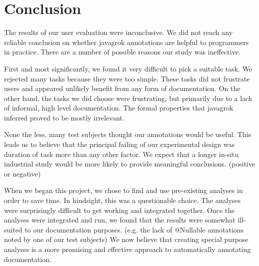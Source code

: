 \section{Conclusion}

The results of our user evaluation were inconclusive.  We did not reach any reliable conclusion on whether javagrok annotations are helpful to programmers in practice.  There are a number of possible reasons our study was ineffective.

First and most significantly, we found it very difficult to pick a suitable task.  We rejected many tasks because they were too simple.  These tasks did not frustrate users and appeared unlikely benefit from any form of documentation.  On the other hand, the tasks we did choose were frustrating, but primarily due to a lack of informal, high level documentation.  The formal properties that javagrok inferred proved to be mostly irrelevant.

None the less, many test subjects thought our annotations would be useful.  This leads us to believe that the principal failing of our experimental design was duration of task more than any other factor.  We expect that a longer in-situ industrial study would be more likely to provide meaningful conclusions. (positive or negative)

When we began this project, we chose to find and use pre-existing analyses in order to save time.  In hindsight, this was a questionable choice.  The analyses were surprisingly difficult to get working and integrated together.  Once the analyses were integrated and run, we found that the results were somewhat ill-suited to our documentation purposes. (e.g. the lack of @Nullable annotations noted by one of our test subjects) We now believe that creating special purpose analyses is a more promising and effective approach to automatically annotating documentation.

